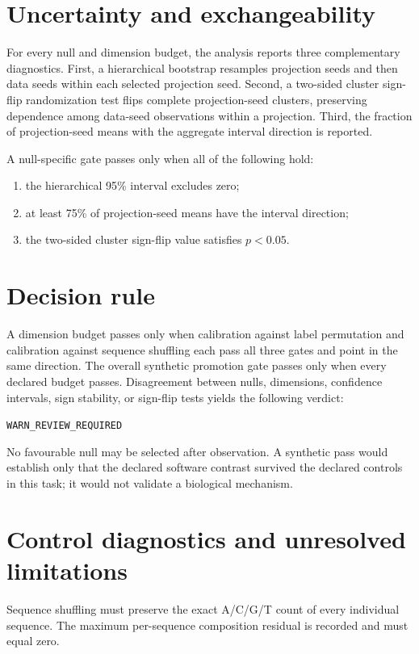 \documentclass[11pt]{article}
\begin{document}
\section{Uncertainty and exchangeability}
For every null and dimension budget, the analysis reports three complementary diagnostics. First, a hierarchical bootstrap resamples projection seeds and then data seeds within each selected projection seed. Second, a two-sided cluster sign-flip randomization test flips complete projection-seed clusters, preserving dependence among data-seed observations within a projection. Third, the fraction of projection-seed means with the aggregate interval direction is reported.

A null-specific gate passes only when all of the following hold:
\begin{enumerate}
  \item the hierarchical 95\% interval excludes zero;
  \item at least 75\% of projection-seed means have the interval direction;
  \item the two-sided cluster sign-flip value satisfies $p < 0.05$.
\end{enumerate}

\section{Decision rule}
A dimension budget passes only when calibration against label permutation and calibration against sequence shuffling each pass all three gates and point in the same direction. The overall synthetic promotion gate passes only when every declared budget passes. Disagreement between nulls, dimensions, confidence intervals, sign stability, or sign-flip tests yields the following verdict:
\begin{center}
\texttt{WARN\_REVIEW\_REQUIRED}
\end{center}

No favourable null may be selected after observation. A synthetic pass would establish only that the declared software contrast survived the declared controls in this task; it would not validate a biological mechanism.

\section{Control diagnostics and unresolved limitations}
Sequence shuffling must preserve the exact A/C/G/T count of every individual sequence. The maximum per-sequence composition residual is recorded and must equal zero.
\end{document}
